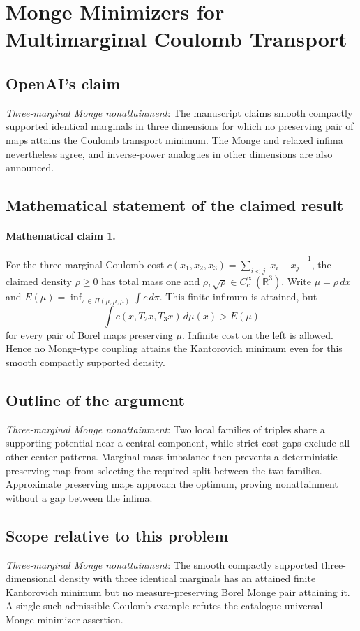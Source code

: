 \documentclass[11pt]{article}
\begin{document}
\section*{Monge Minimizers for Multimarginal Coulomb Transport}

\subsection{OpenAI's claim}
\textit{Three-marginal Monge nonattainment}: The manuscript claims smooth compactly supported identical marginals in three dimensions for which no preserving pair of maps attains the Coulomb transport minimum. The Monge and relaxed infima nevertheless agree, and inverse-power analogues in other dimensions are also announced.

\subsection{Mathematical statement of the claimed result}
\paragraph{Mathematical claim 1.} For the three-marginal Coulomb cost $c(x_1,x_2,x_3)=\sum_{i<j}|x_i-x_j|^{-1}$, the claimed density $\rho\ge0$ has total mass one and $\rho,\sqrt\rho\in C_c^\infty(\mathbb R^3)$. Write $\mu=\rho\,dx$ and $E(\mu)=\inf_{\pi\in\Pi(\mu,\mu,\mu)}\int c\,d\pi$. This finite infimum is attained, but \[\int c(x,T_2x,T_3x)\,d\mu(x)>E(\mu)\] for every pair of Borel maps preserving $\mu$. Infinite cost on the left is allowed. Hence no Monge-type coupling attains the Kantorovich minimum even for this smooth compactly supported density.

\subsection{Outline of the argument}
\textit{Three-marginal Monge nonattainment}: Two local families of triples share a supporting potential near a central component, while strict cost gaps exclude all other center patterns. Marginal mass imbalance then prevents a deterministic preserving map from selecting the required split between the two families. Approximate preserving maps approach the optimum, proving nonattainment without a gap between the infima.

\subsection{Scope relative to this problem}
\textit{Three-marginal Monge nonattainment}: The smooth compactly supported three-dimensional density with three identical marginals has an attained finite Kantorovich minimum but no measure-preserving Borel Monge pair attaining it. A single such admissible Coulomb example refutes the catalogue universal Monge-minimizer assertion.
\end{document}
